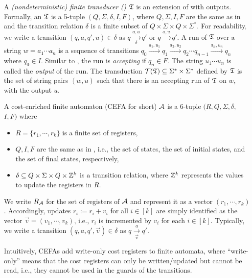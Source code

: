 A \emph{(nondeterministic) finite transducer (\nft)} $\mathfrak{T}$ is an extension of {\nfa} with outputs. Formally, an {\nft} $\mathfrak{T}$ is a 5-tuple $(Q, \Sigma, \delta, I, F)$, where $Q, \Sigma, I, F$ are the same as in {\nfa} and the transition relation $\delta$ is a finite subset of $Q \times \Sigma \times Q \times \Sigma^*$. For readability, we write a transition $(q, a, q', u) \in \delta$ as $q \xrightarrow[\delta]{a, u} q'$ or $q \xrightarrow{a, u} q'$. A run of $\mathfrak{T}$ over a string $w=a_1 \cdots a_n$ is a sequence of transitions $q_0 \xrightarrow{a_1, u_1} q_1\xrightarrow{a_2, u_2} q_2\cdots q_{n-1} \xrightarrow{a_n, u_n} q_n$
where $q_0 \in I$. Similar to {\nfa}, the run is  \emph{accepting} if $q_n \in F$. The string $u_1 \cdots u_n$ is called the \emph{output} of the run. The transduction $\mathcal{T}(\mathfrak{T})\subseteq \Sigma^*\times \Sigma^*$ defined by $\mathfrak{T}$ is the set of string pairs $(w, u)$ such that there is an accepting run of $\mathfrak{T}$ on $w$, with the output $u$.
\begin{definition}
A cost-enriched finite automaton (CEFA for short) $\mathcal{A}$ is a 6-tuple $(R, Q, \Sigma, \delta, $ $I, F)$ where
	\begin{itemize}[topsep=0pt,partopsep=0pt]
            \item $R = \{r_1, \cdots, r_k\}$ is a finite set of registers,
		\item $Q, I, F$ are the same as in {\nfa}, i.e., the set of states, the set of initial states, and the set of final states, respectively, 
		\item $\delta \subseteq Q \times \Sigma \times Q \times \mathbb{Z}^{k}$ is a transition relation, where $\mathbb{Z}^{k}$ represents the values to update the registers in $R$. 
	\end{itemize}
We write $R_{\mathcal{A}}$ for the set of registers of $\mathcal{A}$
and represent it as a vector $(r_1, \cdots, r_k)$. Accordingly, updates $r_i:= r_i + v_i$ for all $i\in [k]$  are simply identified as the vector $\vec{v}=(v_1, \cdots, v_k)$, i.e., $r_i$ is  incremented by $v_i$ for each $i \in [k]$. Typically, we write a transition $(q, a, q', \vec{v}) \in \delta$ as $q \xrightarrow[\vec{v}]{a} q'$.
\end{definition}    
Intuitively, CEFAs add write-only cost registers to finite automata, where ``write-only'' means that the cost registers can only be written/updated but cannot be read, i.e., they cannot be used in the guards of the transitions.  


